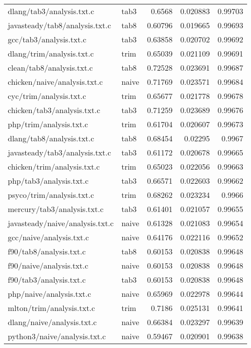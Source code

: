 \begin{longtable}{l l r r r}
{dlang/tab3/analysis.txt.c} & tab3 & 0.6568 & 0.020883 & 0.99703 \\
{javasteady/tab8/analysis.txt.c} & tab8 & 0.60796 & 0.019665 & 0.99693 \\
{gcc/tab3/analysis.txt.c} & tab3 & 0.63858 & 0.020702 & 0.99692 \\
{dlang/trim/analysis.txt.c} & trim & 0.65039 & 0.021109 & 0.99691 \\
{clean/tab8/analysis.txt.c} & tab8 & 0.72528 & 0.023691 & 0.99687 \\
{chicken/naive/analysis.txt.c} & naive & 0.71769 & 0.023571 & 0.99684 \\
{cyc/trim/analysis.txt.c} & trim & 0.65677 & 0.021778 & 0.99678 \\
{chicken/tab3/analysis.txt.c} & tab3 & 0.71259 & 0.023689 & 0.99676 \\
{php/trim/analysis.txt.c} & trim & 0.61704 & 0.020607 & 0.99673 \\
{dlang/tab8/analysis.txt.c} & tab8 & 0.68454 & 0.02295 & 0.9967 \\
{javasteady/tab3/analysis.txt.c} & tab3 & 0.61172 & 0.020678 & 0.99665 \\
{chicken/trim/analysis.txt.c} & trim & 0.65023 & 0.022056 & 0.99663 \\
{php/tab3/analysis.txt.c} & tab3 & 0.66571 & 0.022603 & 0.99662 \\
{psyco/trim/analysis.txt.c} & trim & 0.68262 & 0.023234 & 0.9966 \\
{mercury/tab3/analysis.txt.c} & tab3 & 0.61401 & 0.021057 & 0.99655 \\
{javasteady/naive/analysis.txt.c} & naive & 0.61328 & 0.021083 & 0.99654 \\
{gcc/naive/analysis.txt.c} & naive & 0.64176 & 0.022116 & 0.99652 \\
{f90/tab8/analysis.txt.c} & tab8 & 0.60153 & 0.020838 & 0.99648 \\
{f90/naive/analysis.txt.c} & naive & 0.60153 & 0.020838 & 0.99648 \\
{f90/tab3/analysis.txt.c} & tab3 & 0.60153 & 0.020838 & 0.99648 \\
{php/naive/analysis.txt.c} & naive & 0.65969 & 0.022978 & 0.99644 \\
{mlton/trim/analysis.txt.c} & trim & 0.7186 & 0.025131 & 0.99641 \\
{dlang/naive/analysis.txt.c} & naive & 0.66384 & 0.023297 & 0.99639 \\
{python3/naive/analysis.txt.c} & naive & 0.59467 & 0.020901 & 0.99638 \\

\end{longtable}
